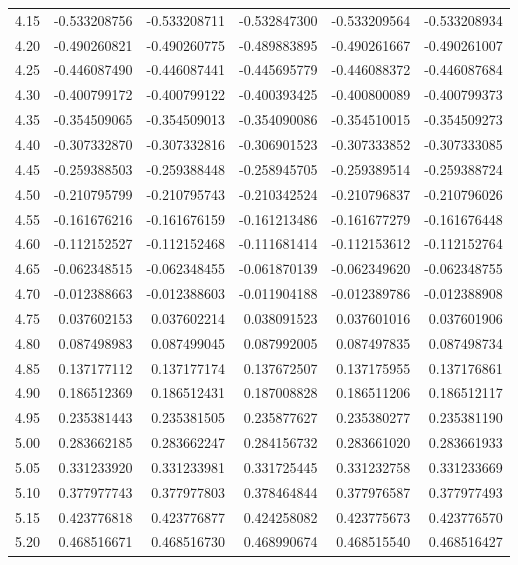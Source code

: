 \documentclass[11pt,a4paper]{article}
\begin{document}
\begin{longtable}{rrrrrr}
4.15 & -0.533208756 & -0.533208711 & -0.532847300 & -0.533209564 & -0.533208934 \\
4.20 & -0.490260821 & -0.490260775 & -0.489883895 & -0.490261667 & -0.490261007 \\
4.25 & -0.446087490 & -0.446087441 & -0.445695779 & -0.446088372 & -0.446087684 \\
4.30 & -0.400799172 & -0.400799122 & -0.400393425 & -0.400800089 & -0.400799373 \\
4.35 & -0.354509065 & -0.354509013 & -0.354090086 & -0.354510015 & -0.354509273 \\
4.40 & -0.307332870 & -0.307332816 & -0.306901523 & -0.307333852 & -0.307333085 \\
4.45 & -0.259388503 & -0.259388448 & -0.258945705 & -0.259389514 & -0.259388724 \\
4.50 & -0.210795799 & -0.210795743 & -0.210342524 & -0.210796837 & -0.210796026 \\
4.55 & -0.161676216 & -0.161676159 & -0.161213486 & -0.161677279 & -0.161676448 \\
4.60 & -0.112152527 & -0.112152468 & -0.111681414 & -0.112153612 & -0.112152764 \\
4.65 & -0.062348515 & -0.062348455 & -0.061870139 & -0.062349620 & -0.062348755 \\
4.70 & -0.012388663 & -0.012388603 & -0.011904188 & -0.012389786 & -0.012388908 \\
4.75 & 0.037602153 & 0.037602214 & 0.038091523 & 0.037601016 & 0.037601906 \\
4.80 & 0.087498983 & 0.087499045 & 0.087992005 & 0.087497835 & 0.087498734 \\
4.85 & 0.137177112 & 0.137177174 & 0.137672507 & 0.137175955 & 0.137176861 \\
4.90 & 0.186512369 & 0.186512431 & 0.187008828 & 0.186511206 & 0.186512117 \\
4.95 & 0.235381443 & 0.235381505 & 0.235877627 & 0.235380277 & 0.235381190 \\
5.00 & 0.283662185 & 0.283662247 & 0.284156732 & 0.283661020 & 0.283661933 \\
5.05 & 0.331233920 & 0.331233981 & 0.331725445 & 0.331232758 & 0.331233669 \\
5.10 & 0.377977743 & 0.377977803 & 0.378464844 & 0.377976587 & 0.377977493 \\
5.15 & 0.423776818 & 0.423776877 & 0.424258082 & 0.423775673 & 0.423776570 \\
5.20 & 0.468516671 & 0.468516730 & 0.468990674 & 0.468515540 & 0.468516427 \\

\end{longtable}
\end{document}
